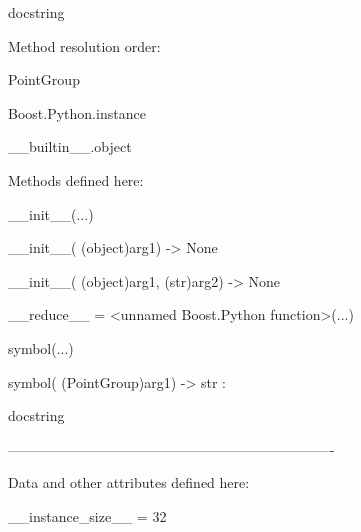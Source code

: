 \documentclass[letterpaper,10pt,english]{sphinxmanual}
\begin{document}
\begin{description}
\begin{description}
\item[{class PointGroup(Boost.Python.instance)}] \leavevmode
\begin{DUlineblock}{0em}
\item[] docstring
\item[] 
\item[] Method resolution order:
\item[]
\begin{DUlineblock}{\DUlineblockindent}
\item[] PointGroup
\item[] Boost.Python.instance
\item[] \_\_builtin\_\_.object
\item[] 
\end{DUlineblock}
\item[] Methods defined here:
\item[] 
\item[] \_\_init\_\_(...)
\item[]
\begin{DUlineblock}{\DUlineblockindent}
\item[] \_\_init\_\_( (object)arg1) -\textgreater{} None
\item[] 
\item[] \_\_init\_\_( (object)arg1, (str)arg2) -\textgreater{} None
\item[] 
\end{DUlineblock}
\item[] \_\_reduce\_\_ = \textless{}unnamed Boost.Python function\textgreater{}(...)
\item[] 
\item[] symbol(...)
\item[]
\begin{DUlineblock}{\DUlineblockindent}
\item[] symbol( (PointGroup)arg1) -\textgreater{} str :
\item[]
\begin{DUlineblock}{\DUlineblockindent}
\item[] docstring
\item[] 
\end{DUlineblock}
\end{DUlineblock}
\item[] ----------------------------------------------------------------------
\item[] Data and other attributes defined here:
\item[] 
\item[] \_\_instance\_size\_\_ = 32
\item[] 

\end{DUlineblock}
\end{description}
\end{description}
\end{document}
